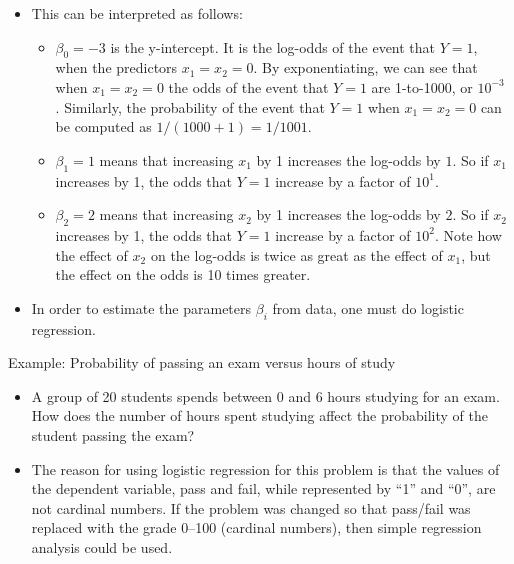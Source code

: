 \documentclass[11pt,dvipsnames,ignorenonframetext,aspectratio=169]{beamer}
\providecommand{\tightlist}{%
  \setlength{\itemsep}{0pt}\setlength{\parskip}{0pt}}
\begin{document}
\begin{frame}{}
\protect\hypertarget{section-5}{}
\begin{itemize}
\tightlist
\item
  This can be interpreted as follows:

  \begin{itemize}
  \tightlist
  \item
    \({\displaystyle \beta _{0}=-3}\) is the y-intercept. It is the
    log-odds of the event that \({\displaystyle Y=1}\), when the
    predictors \({\displaystyle x_{1}=x_{2}=0}\). By exponentiating, we
    can see that when \({\displaystyle x_{1}=x_{2}=0}\) the odds of the
    event that \({\displaystyle Y=1}\) are 1-to-1000, or
    \({\displaystyle 10^{-3}}\) . Similarly, the probability of the
    event that \({\displaystyle Y=1}\) when
    \({\displaystyle x_{1}=x_{2}=0}\) can be computed as
    \({\displaystyle 1/(1000+1)=1/1001}\).
  \item
    \({\displaystyle \beta _{1}=1}\) means that increasing
    \({\displaystyle x_{1}}\) by 1 increases the log-odds by
    \({\displaystyle 1}\). So if \({\displaystyle x_{1}}\) increases by
    1, the odds that \({\displaystyle Y=1}\) increase by a factor of
    \({\displaystyle 10^{1}}\).
  \item
    \({\displaystyle \beta _{2}=2}\) means that increasing
    \({\displaystyle x_{2}}\) by 1 increases the log-odds by
    \({\displaystyle 2}\). So if \({\displaystyle x_{2}}\) increases by
    1, the odds that \({\displaystyle Y=1}\) increase by a factor of
    \({\displaystyle 10^{2}.}\) Note how the effect of
    \({\displaystyle x_{2}}\) on the log-odds is twice as great as the
    effect of \({\displaystyle x_{1}}\), but the effect on the odds is
    10 times greater.
  \end{itemize}
\item
  In order to estimate the parameters \({\displaystyle \beta _{i}}\)
  from data, one must do logistic regression.
\end{itemize}
\end{frame}

\begin{frame}{Example: Probability of passing an exam versus hours of
study}
\protect\hypertarget{example-probability-of-passing-an-exam-versus-hours-of-study}{}
\begin{itemize}
\item
  A group of 20 students spends between 0 and 6 hours studying for an
  exam. How does the number of hours spent studying affect the
  probability of the student passing the exam?
\item
  The reason for using logistic regression for this problem is that the
  values of the dependent variable, pass and fail, while represented by
  ``1'' and ``0'', are not cardinal numbers. If the problem was changed
  so that pass/fail was replaced with the grade 0--100 (cardinal
  numbers), then simple regression analysis could be used.
\end{itemize}
\end{frame}
\end{document}
